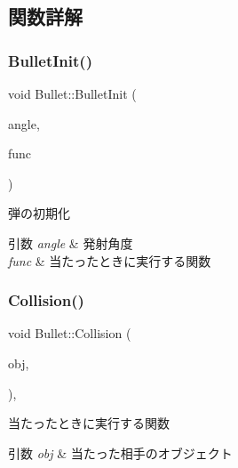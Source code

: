\subsection{関数詳解}
\mbox{\label{class_bullet_ab6b7b4ebc19095372a8e5ef3ad45ff65}} 
\subsubsection{\texorpdfstring{Bullet\+Init()}{BulletInit()}}
{\footnotesize\ttfamily void Bullet\+::\+Bullet\+Init (\begin{DoxyParamCaption}\item[{const float}]{angle,  }\item[{const std\+::function$<$ void()$>$ \&}]{func }\end{DoxyParamCaption})}



弾の初期化 


\begin{DoxyParams}{引数}
{\em angle} & 発射角度 \\
\hline
{\em func} & 当たったときに実行する関数 \\
\hline
\end{DoxyParams}
\mbox{\label{class_bullet_a7a6bbc20017be35140ed1099ea457429}} 
\subsubsection{\texorpdfstring{Collision()}{Collision()}}
{\footnotesize\ttfamily void Bullet\+::\+Collision (\begin{DoxyParamCaption}\item[{\mbox{\hyperlink{class_object_base}{Object\+Base}} $\ast$}]{obj,  }\item[{\mbox{\hyperlink{common_8h_ae148fff5818e9444b4ab2288829559bf}{Vec2}}}]{ }\end{DoxyParamCaption})\hspace{0.3cm}{\ttfamily [final]}, {\ttfamily [virtual]}}



当たったときに実行する関数 


\begin{DoxyParams}{引数}
{\em obj} & 当たった相手のオブジェクト \\
\hline
\end{DoxyParams}


